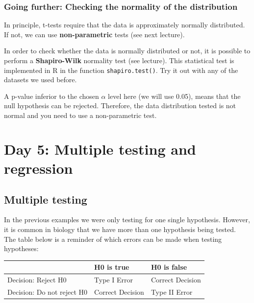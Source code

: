 \documentclass[
]{book}
\begin{document}
\hypertarget{going-further-checking-the-normality-of-the-distribution}{%
\subsubsection{Going further: Checking the normality of the distribution}\label{going-further-checking-the-normality-of-the-distribution}}

In principle, t-tests require that the data is approximately normally distributed.
If not, we can use \textbf{non-parametric} tests (see next lecture).

In order to check whether the data is normally distributed or not, it is possible to perform a \textbf{Shapiro-Wilk} normality test (see lecture).
This statistical test is implemented in R in the function \texttt{shapiro.test()}. Try it out with any of the datasets we used before.

A p-value inferior to the chosen \(\alpha\) level here (we will use 0.05), means that the null hypothesis can be rejected. Therefore, the data distribution tested is not normal and you need to use a non-parametric test.

\hypertarget{day-5-multiple-testing-and-regression}{%
\section{Day 5: Multiple testing and regression}\label{day-5-multiple-testing-and-regression}}

\hypertarget{multiple-testing}{%
\subsection{Multiple testing}\label{multiple-testing}}

In the previous examples we were only testing for one single hypothesis. However, it is common in biology that we have more than one hypothesis being tested.\\
The table below is a reminder of which errors can be made when testing hypotheses:

\begin{tabular}{l|l|l}
\hline
 & H0 is true & H0 is false\\
\hline
Decision: Reject H0 & Type I Error & Correct Decision\\
\hline
Decision: Do not reject H0 & Correct Decision & Type II Error\\
\hline
\end{tabular}
\end{document}
